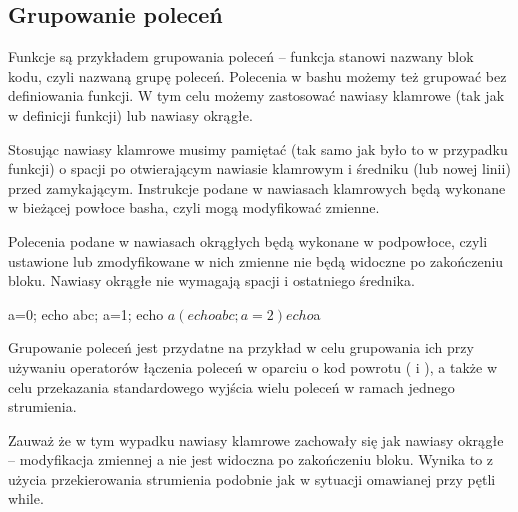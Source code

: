 \subsection{Grupowanie poleceń}

Funkcje są przykładem grupowania poleceń – funkcja stanowi nazwany blok kodu, czyli nazwaną grupę poleceń.
Polecenia w bashu możemy też grupować bez definiowania funkcji.
W tym celu możemy zastosować nawiasy klamrowe (tak jak w definicji funkcji) lub nawiasy okrągłe.

Stosując nawiasy klamrowe musimy pamiętać (tak samo jak było to w przypadku funkcji)
	o spacji po otwierającym nawiasie klamrowym i średniku (lub nowej linii) przed zamykającym.
Instrukcje podane w nawiasach klamrowych będą wykonane w bieżącej powłoce basha, czyli mogą modyfikować zmienne.

Polecenia podane w nawiasach okrągłych będą wykonane w podpowłoce, czyli ustawione lub zmodyfikowane w nich zmienne nie będą widoczne po zakończeniu bloku. Nawiasy okrągłe nie wymagają spacji i ostatniego średnika.

\begin{CodeFrame*}[bash]{}
a=0;
{ echo abc; a=1; }
echo $a
(echo abc; a=2)
echo $a
\end{CodeFrame*}

Grupowanie poleceń jest przydatne na przykład w celu grupowania ich przy używaniu operatorów łączenia poleceń w oparciu o kod powrotu (\shell{&&} i \shell{||}), a także w celu przekazania standardowego wyjścia wielu poleceń w ramach jednego strumienia.


Zauważ że w tym wypadku nawiasy klamrowe zachowały się jak nawiasy okrągłe – modyfikacja zmiennej a nie jest widoczna po zakończeniu bloku. Wynika to z użycia przekierowania strumienia podobnie jak w sytuacji omawianej przy pętli while.

